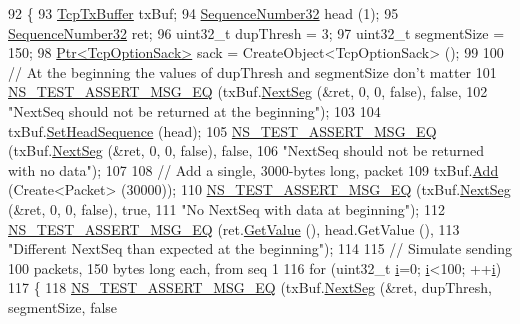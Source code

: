 \begin{DoxyCode}
92 \{
93   \hyperlink{classns3_1_1TcpTxBuffer}{TcpTxBuffer} txBuf;
94   \hyperlink{classns3_1_1SequenceNumber}{SequenceNumber32} head (1);
95   \hyperlink{classns3_1_1SequenceNumber}{SequenceNumber32} ret;
96   uint32\_t dupThresh = 3;
97   uint32\_t segmentSize = 150;
98   \hyperlink{classns3_1_1Ptr}{Ptr<TcpOptionSack>} sack = CreateObject<TcpOptionSack> ();
99 
100   \textcolor{comment}{// At the beginning the values of dupThresh and segmentSize don't matter}
101   \hyperlink{group__testing_ga2a9d78cffb3db8e867c35fff0b698cf5}{NS\_TEST\_ASSERT\_MSG\_EQ} (txBuf.\hyperlink{classns3_1_1TcpTxBuffer_ad08eadd0ba92849a4c4a6920b72acb69}{NextSeg} (&ret, 0, 0, \textcolor{keyword}{false}), \textcolor{keyword}{false},
102                          \textcolor{stringliteral}{"NextSeq should not be returned at the beginning"});
103 
104   txBuf.\hyperlink{classns3_1_1TcpTxBuffer_ae9d25292f14d338abe26a2657e103921}{SetHeadSequence} (head);
105   \hyperlink{group__testing_ga2a9d78cffb3db8e867c35fff0b698cf5}{NS\_TEST\_ASSERT\_MSG\_EQ} (txBuf.\hyperlink{classns3_1_1TcpTxBuffer_ad08eadd0ba92849a4c4a6920b72acb69}{NextSeg} (&ret, 0, 0, \textcolor{keyword}{false}), \textcolor{keyword}{false},
106                          \textcolor{stringliteral}{"NextSeq should not be returned with no data"});
107 
108   \textcolor{comment}{// Add a single, 3000-bytes long, packet}
109   txBuf.\hyperlink{classns3_1_1TcpTxBuffer_a275d96f2c58333c9e7c5fe0f1fa152e1}{Add} (Create<Packet> (30000));
110   \hyperlink{group__testing_ga2a9d78cffb3db8e867c35fff0b698cf5}{NS\_TEST\_ASSERT\_MSG\_EQ} (txBuf.\hyperlink{classns3_1_1TcpTxBuffer_ad08eadd0ba92849a4c4a6920b72acb69}{NextSeg} (&ret, 0, 0, \textcolor{keyword}{false}), \textcolor{keyword}{true},
111                          \textcolor{stringliteral}{"No NextSeq with data at beginning"});
112   \hyperlink{group__testing_ga2a9d78cffb3db8e867c35fff0b698cf5}{NS\_TEST\_ASSERT\_MSG\_EQ} (ret.\hyperlink{classns3_1_1SequenceNumber_ad1dc215eb95f5371596af8ec914d3e72}{GetValue} (), head.GetValue (),
113                          \textcolor{stringliteral}{"Different NextSeq than expected at the beginning"});
114 
115   \textcolor{comment}{// Simulate sending 100 packets, 150 bytes long each, from seq 1}
116   \textcolor{keywordflow}{for} (uint32\_t \hyperlink{bernuolliDistribution_8m_a6f6ccfcf58b31cb6412107d9d5281426}{i}=0; \hyperlink{bernuolliDistribution_8m_a6f6ccfcf58b31cb6412107d9d5281426}{i}<100; ++\hyperlink{bernuolliDistribution_8m_a6f6ccfcf58b31cb6412107d9d5281426}{i})
117     \{
118       \hyperlink{group__testing_ga2a9d78cffb3db8e867c35fff0b698cf5}{NS\_TEST\_ASSERT\_MSG\_EQ} (txBuf.\hyperlink{classns3_1_1TcpTxBuffer_ad08eadd0ba92849a4c4a6920b72acb69}{NextSeg} (&ret, dupThresh, segmentSize, \textcolor{keyword}{false}

\end{DoxyCode}

